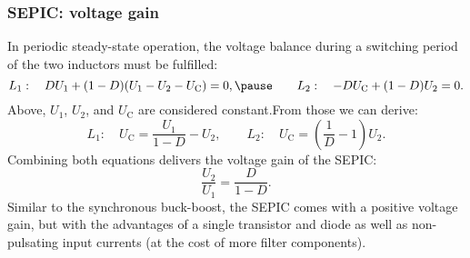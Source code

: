 
\begin{frame}
    \frametitle{SEPIC: voltage gain}
    In periodic steady-state operation, the voltage balance during a switching period of the two inductors must be fulfilled:
    \begin{equation}
        L_1:\quad D U_1 + (1-D)(U_1-U_2-U_\mathrm{C})=0,\pause \qquad L_2:\quad -DU_\mathrm{C} + (1-D)U_2=0.
    \end{equation}
    Above, $U_1$, $U_2$, and $U_\mathrm{C}$ are considered constant.\pause From those we can derive:
    \begin{equation}
        L_1:\quad U_\mathrm{C}=\frac{U_1}{1-D}-U_2, \qquad L_2:\quad U_\mathrm{C}=\left(\frac{1}{D}-1\right)U_2.
    \end{equation}\pause
    Combining both equations delivers the voltage gain of the SEPIC:
    \begin{equation}
        \frac{U_2}{U_1} = \frac{D}{1-D}.
    \end{equation}\pause
    Similar to the synchronous buck-boost, the SEPIC comes with a positive voltage gain, but with the advantages of a single transistor and diode as well as non-pulsating input currents (at the cost of more filter components).
\end{frame}

